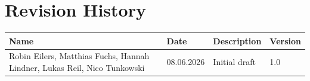 


\chapter*{Revision History}

\begin{center}
	\begin{tabular}{ |p{4cm}|p{2.5cm}|p{5cm}|p{2cm}| } 
		\hline
		\rowcolor{black!3}
		Name & Date & Description & Version \\ 
		\hline
		Robin Eilers, Matthias Fuchs, Hannah Lindner, Lukas Reil, Nico Tunkowski & 08.06.2026 & Initial draft & 1.0\\ 
		\hline
	\end{tabular}
\end{center}

